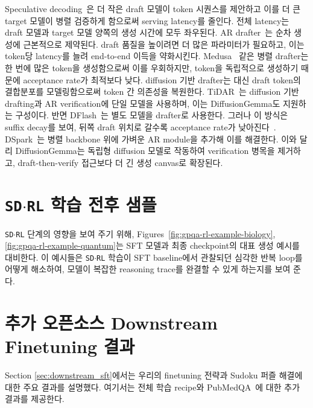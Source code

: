 \documentclass[11pt, a4paper, logo, copyright, gdm]{google}
\newcommand{\sdrl}{\texttt{{\small SD$\cdot$RL}}\xspace}
\begin{document}
Speculative decoding~\citep{leviathan2023fast,chen2023accelerating,xia-etal-2024-unlocking}은 더 작은 draft 모델이 token 시퀀스를 제안하고 이를 더 큰 target 모델이 병렬 검증하게 함으로써 serving latency를 줄인다. 전체 latency는 draft 모델과 target 모델 양쪽의 생성 시간에 모두 좌우된다. AR drafter~\citep{li2026eagle}는 순차 생성에 근본적으로 제약된다. draft 품질을 높이려면 더 많은 파라미터가 필요하고, 이는 token당 latency를 늘려 end-to-end 이득을 약화시킨다. Medusa~\citep{cai2024medusa} 같은 병렬 drafter는 한 번에 많은 token을 생성함으로써 이를 우회하지만, token을 독립적으로 생성하기 때문에 acceptance rate가 최적보다 낮다. diffusion 기반 drafter는 대신 draft token의 결합분포를 모델링함으로써 token 간 의존성을 복원한다. TiDAR~\citep{liu2025tidar}는 diffusion 기반 drafting과 AR verification에 단일 모델을 사용하며, 이는 DiffusionGemma도 지원하는 구성이다. 반면 DFlash~\citep{chen2026dflash}는 별도 모델을 drafter로 사용한다. 그러나 이 방식은 suffix decay를 보여, 뒤쪽 draft 위치로 갈수록 acceptance rate가 낮아진다~\citep{cheng2026dspark}. DSpark~\citep{cheng2026dspark}는 병렬 backbone 위에 가벼운 AR module을 추가해 이를 해결한다. 이와 달리 DiffusionGemma는 독립형 diffusion 모델로 작동하여 verification 병목을 제거하고, draft-then-verify 접근보다 더 긴 생성 canvas로 확장된다.





\section{\texorpdfstring{\sdrl}{} 학습 전후 샘플}\label{sec:samples_before_after_sdrl}

\sdrl 단계의 영향을 보여 주기 위해, Figures~\ref{fig:gpqa-rl-example-biology}, \ref{fig:gpqa-rl-example-quantum}는 SFT 모델과 최종 checkpoint의 대표 생성 예시를 대비한다. 이 예시들은 \sdrl 학습이 SFT baseline에서 관찰되던 심각한 반복 loop를 어떻게 해소하여, 모델이 복잡한 reasoning trace를 완결할 수 있게 하는지를 보여 준다.





\section{추가 오픈소스 Downstream Finetuning 결과}
\label{sec:sft-hd-appendix}

Section \ref{sec:downstream_sft}에서는 우리의 finetuning 전략과 Sudoku 퍼즐 해결에 대한 주요 결과를 설명했다. 여기서는 전체 학습 recipe와 PubMedQA~\citep{jin2019pubmedqa}에 대한 추가 결과를 제공한다.
\end{document}
